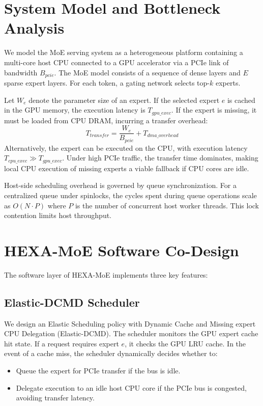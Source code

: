 \documentclass[conference]{IEEEtran}
\begin{document}
\section{System Model and Bottleneck Analysis}
We model the MoE serving system as a heterogeneous platform containing a multi-core host CPU connected to a GPU accelerator via a PCIe link of bandwidth $B_{pcie}$. The MoE model consists of a sequence of dense layers and $E$ sparse expert layers. For each token, a gating network selects top-$k$ experts.

Let $W_e$ denote the parameter size of an expert. If the selected expert $e$ is cached in the GPU memory, the execution latency is $T_{gpu\_exec}$. If the expert is missing, it must be loaded from CPU DRAM, incurring a transfer overhead:
\begin{equation}
    T_{transfer} = \frac{W_e}{B_{pcie}} + T_{dma\_overhead}
\end{equation}
Alternatively, the expert can be executed on the CPU, with execution latency $T_{cpu\_exec} \gg T_{gpu\_exec}$. Under high PCIe traffic, the transfer time dominates, making local CPU execution of missing experts a viable fallback if CPU cores are idle.

Host-side scheduling overhead is governed by queue synchronization. For a centralized queue under spinlocks, the cycles spent during queue operations scale as $O(N \cdot P)$ where $P$ is the number of concurrent host worker threads. This lock contention limits host throughput.

\section{HEXA-MoE Software Co-Design}
The software layer of HEXA-MoE implements three key features:

\subsection{Elastic-DCMD Scheduler}
We design an Elastic Scheduling policy with Dynamic Cache and Missing expert CPU Delegation (Elastic-DCMD). The scheduler monitors the GPU expert cache hit state. If a request requires expert $e$, it checks the GPU LRU cache. In the event of a cache miss, the scheduler dynamically decides whether to:
\begin{itemize}
    \item Queue the expert for PCIe transfer if the bus is idle.
    \item Delegate execution to an idle host CPU core if the PCIe bus is congested, avoiding transfer latency.
\end{itemize}
\end{document}
